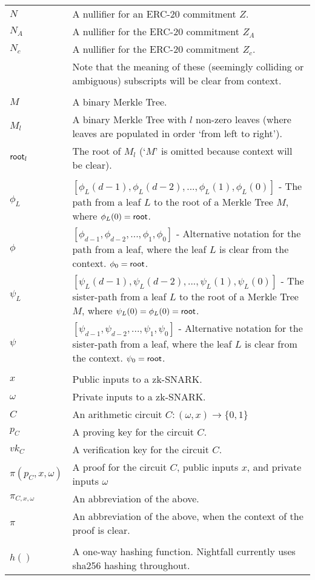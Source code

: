 \begin{center}
\begin{tabular}{lp{14cm}}
    $N$           & A nullifier for an ERC-20 commitment $Z$.\\
    $N_A$         & A nullifier for the ERC-20 commitment $Z_A$\\
    $N_c$         & A nullifier for the ERC-20 commitment $Z_c$.\\
                  & Note that the meaning of these (seemingly colliding or ambiguous) subscripts will be clear from context.\\
    \\
		$M$           & A binary Merkle Tree.\\
    $M_l$         & A binary Merkle Tree with $l$ non-zero leaves (where leaves are populated in order `from left to right').\\
    $\mathsf{root}_l$      & The root of $M_l$ (`$M$' is omitted because context will be clear).\\
    \\
    $\phi_{L}$    & $[\phi_{L}(d-1), \phi_{L}(d-2),..., \phi_{L}(1), \phi_{L}(0)]$ - The path from a leaf $L$ to the root of a Merkle Tree $M$, where $\phi_L(0) = \mathsf{root}$.\\
    $\phi$        & $[\phi_{d-1}, \phi_{d-2},..., \phi_{1}, \phi_0]$ - Alternative notation for the path from a leaf, where the leaf $L$ is clear from the context. $\phi_0 = \mathsf{root}$.\\
    $\psi_{L}$    & $[\psi_{L}(d-1), \psi_{L}(d-2),..., \psi_{L}(1), \psi_{L}(0)]$ - The sister-path from a leaf $L$ to the root of a Merkle Tree $M$, where $\psi_L(0) = \phi_L(0) = \mathsf{root}$.\\
    $\psi$        &  $[\psi_{d-1}, \psi_{d-2},..., \psi_{1}, \psi_0]$ - Alternative notation for the sister-path from a leaf, where the leaf $L$ is clear from the context. $\psi_0 = \mathsf{root}$.\\
    \\
		$x$           & Public inputs to a zk-SNARK. \\
		$\omega$      & Private inputs to a zk-SNARK.\\
		$C$           & An arithmetic circuit $C: (\omega, x) \to \{0,1\}$\\
		$p_C$         & A proving key for the circuit $C$. \\
		$vk_C$        & A verification key for the circuit $C$. \\
    $\pi(p_C, x, \omega)$ & A proof for the circuit $C$, public inputs $x$, and private inputs $\omega$ \\
    $\pi_{C, x, \omega}$ & An abbreviation of the above. \\
    $\pi$         & An abbreviation of the above, when the context of the proof is clear.\\
    \\
    $h()$         & A one-way hashing function. Nightfall currently uses sha256 hashing throughout.\\
  \end{tabular}
\end{center}